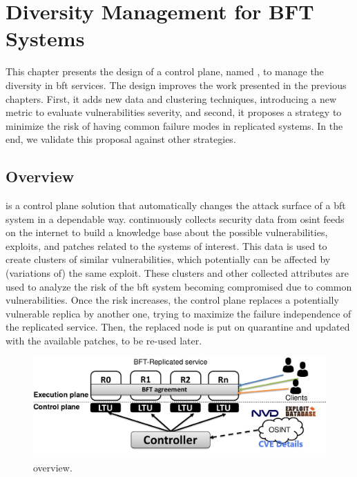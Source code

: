 \chapter{Diversity Management for BFT Systems} 
\label{chap:lazarus_design}

This chapter presents the design of a control plane, named \system, to manage the diversity in \gls{bft} services.
The design improves the work presented in the previous chapters.
First, it adds new data and clustering techniques, introducing a new metric to evaluate vulnerabilities severity, and second, it proposes a strategy to minimize the risk of having common failure modes in replicated systems.
In the end, we validate this proposal against other strategies.

\section{Overview}
\system is a control plane solution that automatically changes the attack surface of a \gls{bft} system in a dependable way.
\system continuously collects security data from \gls{osint} feeds on the internet to build a knowledge base about the possible vulnerabilities, exploits, and patches related to the systems of interest.
This data is used to create clusters of similar vulnerabilities, which potentially can be affected by (variations of) the same exploit.
These clusters and other collected attributes are used to analyze the risk of the \gls{bft} system becoming compromised due to common vulnerabilities.
Once the risk increases, the control plane replaces a potentially vulnerable replica by another one, trying to maximize the failure independence of the replicated service.
Then, the replaced node is put on quarantine and updated with the available patches, to be re-used later.

\begin{figure}[t]
\begin{center}
\includegraphics[width=0.7\columnwidth]{images/images/overview.pdf}
\caption{\system overview.}
\label{fig:overview}
\end{center}
\end{figure}

